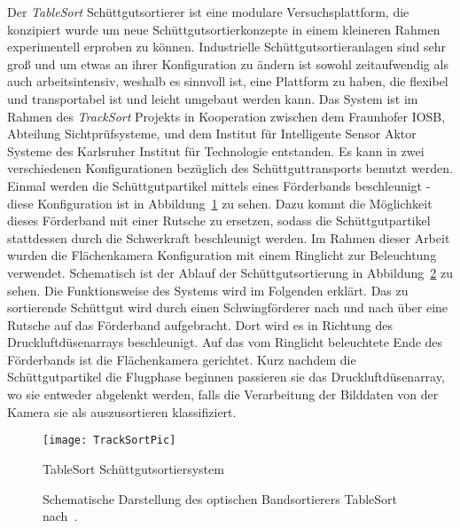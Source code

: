 Der \textit{TableSort} Schüttgutsortierer ist eine modulare Versuchsplattform, die konzipiert wurde um neue Schüttgutsortierkonzepte in einem kleineren Rahmen experimentell erproben zu können.
Industrielle Schüttgutsortieranlagen sind sehr groß und um etwas an ihrer Konfiguration zu ändern ist sowohl zeitaufwendig als auch arbeitsintensiv, 
weshalb es sinnvoll ist, eine Plattform zu haben, die flexibel und transportabel ist und leicht umgebaut werden kann.
Das System ist im Rahmen des \textit{TrackSort} Projekts in Kooperation zwischen dem Fraunhofer IOSB, Abteilung Sichtprüfsysteme, und dem Institut für Intelligente Sensor Aktor Systeme des Karlsruher Institut für Technologie entstanden\cite{doll2015}.
Es kann in zwei verschiedenen Konfigurationen bezüglich des Schüttguttransports benutzt werden.
Einmal werden die Schüttgutpartikel mittels eines Förderbands beschleunigt - diese Konfiguration ist in Abbildung~\ref{fig:tablesortsystem} zu sehen.
Dazu kommt die Möglichkeit dieses Förderband mit einer Rutsche zu ersetzen, sodass die Schüttgutpartikel stattdessen durch die Schwerkraft beschleunigt werden. 
Im Rahmen dieser Arbeit wurden die Flächenkamera Konfiguration mit einem Ringlicht zur Beleuchtung verwendet.
Schematisch ist der Ablauf der Schüttgutsortierung in Abbildung~\ref{fig:aufbau_tablesort} zu sehen.
Die Funktionsweise des Systems wird im Folgenden erklärt.
Das zu sortierende Schüttgut wird durch einen Schwingförderer nach und nach über eine Rutsche auf das Förderband aufgebracht.
Dort wird es in Richtung des Druckluftdüsenarrays beschleunigt. 
Auf das vom Ringlicht beleuchtete Ende des Förderbands ist die Flächenkamera gerichtet.
Kurz nachdem die Schüttgutpartikel die Flugphase beginnen passieren sie das Druckluftdüsenarray, wo sie entweder abgelenkt werden, 
falls die Verarbeitung der Bilddaten von der Kamera sie als auszusortieren klassifiziert.

\begin{figure}[h]
	\texttt{[image: TrackSortPic]}
	\caption{TableSort Schüttgutsortiersystem \cite{fraunhoferiosb2017}}
	\label{fig:tablesortsystem}
\end{figure}


\begin{figure}[h]
    \centering
    \def\svgwidth{\columnwidth}
	
	\caption[Schematische Darstellung des optischen Bandsortierers TableSort nach~\cite{Pfaff2017}.]{
		Schematische Darstellung des optischen Bandsortierers TableSort nach~\cite{Pfaff2017}.
	}
	\label{fig:aufbau_tablesort}

\end{figure}


